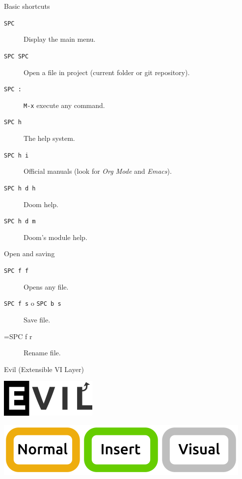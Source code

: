 \documentclass[presentation]{beamer}
\begin{document}
\begin{frame}[label={sec:orga5e4c0e},fragile]{Basic shortcuts}
 \begin{description}
\item[{\texttt{SPC} }] Display the main menu.
\item[{\texttt{SPC SPC}}] Open a file in project (current folder or git repository).
\item[{\texttt{SPC :}}] \texttt{M-x} execute any command.
\item[{\texttt{SPC h} }] The help system.
\item[{\texttt{SPC h i} }] Official manuals (look for \emph{Org Mode} and \emph{Emacs}).
\item[{\texttt{SPC h d h} }] Doom help.
\item[{\texttt{SPC h d m} }] Doom's module help.
\end{description}
\end{frame}

\begin{frame}[label={sec:org532fe7e},fragile]{Open and saving}
 \begin{description}
\item[{\texttt{SPC f f}}] Opens any file.
\item[{\texttt{SPC f s} o \texttt{SPC b s}}] Save file.
\item[{=SPC f r}] Rename file.
\end{description}
\end{frame}

\begin{frame}[label={sec:orgc800dbc}]{Evil (Extensible VI Layer)}
\begin{center}
\includegraphics[height=3 em]{./evil.png}
\end{center}

\begin{center}
\includegraphics[width=\textwidth]{./vim.png}
\end{center}
\end{frame}
\end{document}
